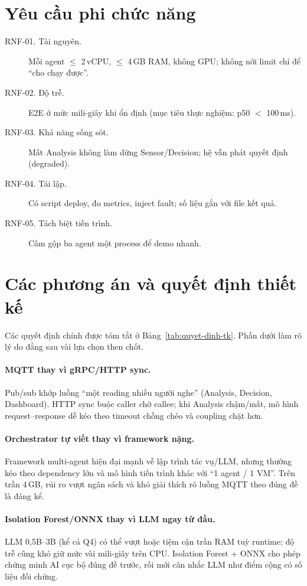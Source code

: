 \documentclass[12pt,a4paper,oneside]{report}
\begin{document}
\section{Yêu cầu phi chức năng}

\begin{description}
  \item[RNF-01. Tài nguyên.] Mỗi agent $\leq$ 2\,vCPU, $\leq$ 4\,GB RAM, không GPU; không nới limit chỉ để ``cho chạy được''.
  \item[RNF-02. Độ trễ.] E2E ở mức mili-giây khi ổn định (mục tiêu thực nghiệm: p50 $<$ 100\,ms).
  \item[RNF-03. Khả năng sống sót.] Mất Analysis không làm dừng Sensor/Decision; hệ vẫn phát quyết định (degraded).
  \item[RNF-04. Tái lập.] Có script deploy, đo metrics, inject fault; số liệu gắn với file kết quả.
  \item[RNF-05. Tách biệt tiến trình.] Cấm gộp ba agent một process để demo nhanh.
\end{description}

\section{Các phương án và quyết định thiết kế}

Các quyết định chính được tóm tắt ở Bảng~\ref{tab:quyet-dinh-tk}. Phần dưới làm rõ lý do đằng sau vài lựa chọn then chốt.

\paragraph{MQTT thay vì gRPC/HTTP sync.}
Pub/sub khớp luồng ``một reading nhiều người nghe'' (Analysis, Decision, Dashboard). HTTP sync buộc caller chờ callee; khi Analysis chậm/mất, mô hình request--response dễ kéo theo timeout chồng chéo và coupling chặt hơn.

\paragraph{Orchestrator tự viết thay vì framework nặng.}
Framework multi-agent hiện đại mạnh về lập trình tác vụ/LLM, nhưng thường kéo theo dependency lớn và mô hình tiến trình khác với ``1 agent / 1 VM''. Trên trần 4\,GB, rủi ro vượt ngân sách và khó giải thích rõ luồng MQTT theo đúng đề là đáng kể.

\paragraph{Isolation Forest/ONNX thay vì LLM ngay từ đầu.}
LLM 0,5B--3B (kể cả Q4) có thể vượt hoặc tiệm cận trần RAM tuỳ runtime; độ trễ cũng khó giữ mức vài mili-giây trên CPU. Isolation Forest + ONNX cho phép chứng minh AI cục bộ đúng đề trước, rồi mới cân nhắc LLM như điểm cộng có số liệu đối chứng.
\end{document}
